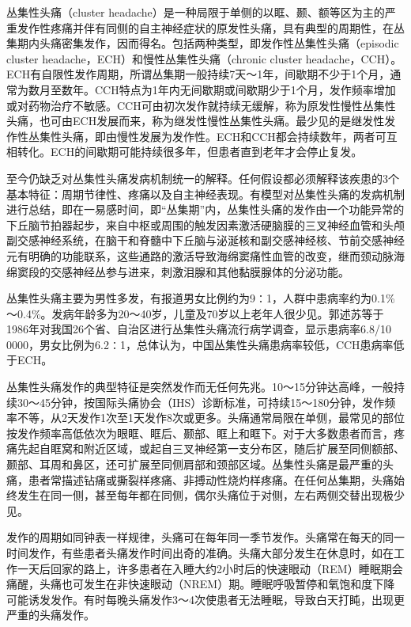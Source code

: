 丛集性头痛（cluster
headache）是一种局限于单侧的以眶、颞、额等区为主的严重发作性疼痛并伴有同侧的自主神经症状的原发性头痛，具有典型的周期性，在丛集期内头痛密集发作，因而得名。包括两种类型，即发作性丛集性头痛（episodic
cluster headache，ECH）和慢性丛集性头痛（chronic cluster
headache，CCH）。ECH有自限性发作周期，所谓丛集期一般持续7天～1年，间歇期不少于1个月，通常为数月至数年。CCH特点为1年内无间歇期或间歇期少于1个月，发作频率增加或对药物治疗不敏感。CCH可由初次发作就持续无缓解，称为原发性慢性丛集性头痛，也可由ECH发展而来，称为继发性慢性丛集性头痛。最少见的是继发性发作性丛集性头痛，即由慢性发展为发作性。ECH和CCH都会持续数年，两者可互相转化。ECH的间歇期可能持续很多年，但患者直到老年才会停止复发。

至今仍缺乏对丛集性头痛发病机制统一的解释。任何假设都必须解释该疾患的3个基本特征：周期节律性、疼痛以及自主神经表现。有模型对丛集性头痛的发病机制进行总结，即在一易感时间，即“丛集期”内，丛集性头痛的发作由一个功能异常的下丘脑节拍器起步，来自中枢或周围的触发因素激活硬脑膜的三叉神经血管和头颅副交感神经系统，在脑干和脊髓中下丘脑与泌涎核和副交感神经核、节前交感神经元有明确的功能联系，这些通路的激活导致海绵窦痛性血管的改变，继而颈动脉海绵窦段的交感神经丛参与进来，刺激泪腺和其他黏膜腺体的分泌功能。

丛集性头痛主要为男性多发，有报道男女比例约为9∶1，人群中患病率约为0.1\%～0.4\%。发病年龄多为20～40岁，儿童及70岁以上老年人很少见。郭述苏等于1986年对我国26个省、自治区进行丛集性头痛流行病学调查，显示患病率6.8/10
0000，男女比例为6.2∶1，总体认为，中国丛集性头痛患病率较低，CCH患病率低于ECH。

丛集性头痛发作的典型特征是突然发作而无任何先兆。10～15分钟达高峰，一般持续30～45分钟，按国际头痛协会（IHS）诊断标准，可持续15～180分钟，发作频率不等，从2天发作1次至1天发作8次或更多。头痛通常局限在单侧，最常见的部位按发作频率高低依次为眼眶、眶后、颞部、眶上和眶下。对于大多数患者而言，疼痛先起自眶窝和附近区域，或起自三叉神经第一支分布区，随后扩展至同侧额部、颞部、耳周和鼻区，还可扩展至同侧肩部和颈部区域。丛集性头痛是最严重的头痛，患者常描述钻痛或撕裂样疼痛、非搏动性烧灼样疼痛。在任何丛集期，头痛始终发生在同一侧，甚至每年都在同侧，偶尔头痛位于对侧，左右两侧交替出现极少见。

发作的周期如同钟表一样规律，头痛可在每年同一季节发作。头痛常在每天的同一时间发作，有些患者头痛发作时间出奇的准确。头痛大部分发生在休息时，如在工作一天后回家的路上，许多患者在入睡大约2小时后的快速眼动（REM）睡眠期会痛醒，头痛也可发生在非快速眼动（NREM）期。睡眠呼吸暂停和氧饱和度下降可能诱发发作。有时每晚头痛发作3～4次使患者无法睡眠，导致白天打盹，出现更严重的头痛发作。

